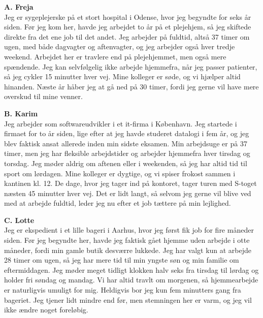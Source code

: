 \vspace{0.2em}
\begin{tcolorbox}[enhanced, breakable, colback=NCDBgGray, colframe=NCDGray, arc=2pt, boxrule=0.7pt, borderline west={3pt}{0pt}{NCDNavy}, left=10pt, right=10pt, top=5pt, bottom=5pt]
\textbf{\color{NCDNavy}A. Freja}\\[2pt]
Jeg er sygeplejerske på et stort hospital i Odense, hvor jeg begyndte for seks år siden. Før jeg kom her, havde jeg arbejdet to år på et plejehjem, så jeg skiftede direkte fra det ene job til det andet. Jeg arbejder på fuldtid, altså 37 timer om ugen, med både dagvagter og aftenvagter, og jeg arbejder også hver tredje weekend. Arbejdet her er travlere end på plejehjemmet, men også mere spændende. Jeg kan selvfølgelig ikke arbejde hjemmefra, når jeg passer patienter, så jeg cykler 15 minutter hver vej. Mine kolleger er søde, og vi hjælper altid hinanden. Næste år håber jeg at gå ned på 30 timer, fordi jeg gerne vil have mere overskud til mine venner.
\end{tcolorbox}

\begin{tcolorbox}[enhanced, breakable, colback=NCDBgGray, colframe=NCDGray, arc=2pt, boxrule=0.7pt, borderline west={3pt}{0pt}{NCDTeal}, left=10pt, right=10pt, top=5pt, bottom=5pt]
\textbf{\color{NCDTeal}B. Karim}\\[2pt]
Jeg arbejder som softwareudvikler i et it-firma i København. Jeg startede i firmaet for to år siden, lige efter at jeg havde studeret datalogi i fem år, og jeg blev faktisk ansat allerede inden min sidste eksamen. Min arbejdsuge er på 37 timer, men jeg har fleksible arbejdstider og arbejder hjemmefra hver tirsdag og torsdag. Jeg møder aldrig om aftenen eller i weekenden, så jeg har altid tid til sport om lørdagen. Mine kolleger er dygtige, og vi spiser frokost sammen i kantinen kl. 12. De dage, hvor jeg tager ind på kontoret, tager turen med S-toget næsten 45 minutter hver vej. Det er lidt langt, så selvom jeg gerne vil blive ved med at arbejde fuldtid, leder jeg nu efter et job tættere på min lejlighed.
\end{tcolorbox}

\begin{tcolorbox}[enhanced, breakable, colback=NCDBgGray, colframe=NCDGray, arc=2pt, boxrule=0.7pt, borderline west={3pt}{0pt}{NCDRed}, left=10pt, right=10pt, top=5pt, bottom=5pt]
\textbf{\color{NCDRed}C. Lotte}\\[2pt]
Jeg er ekspedient i et lille bageri i Aarhus, hvor jeg først fik job for fire måneder siden. Før jeg begyndte her, havde jeg faktisk gået hjemme uden arbejde i otte måneder, fordi min gamle butik desværre lukkede. Jeg har valgt kun at arbejde 28 timer om ugen, så jeg har mere tid til min yngste søn og min familie om eftermiddagen. Jeg møder meget tidligt klokken halv seks fra tirsdag til lørdag og holder fri søndag og mandag. Vi har altid travlt om morgenen, så hjemmearbejde er naturligvis umuligt for mig. Heldigvis bor jeg kun fem minutters gang fra bageriet. Jeg tjener lidt mindre end før, men stemningen her er varm, og jeg vil ikke ændre noget foreløbig.
\end{tcolorbox}

